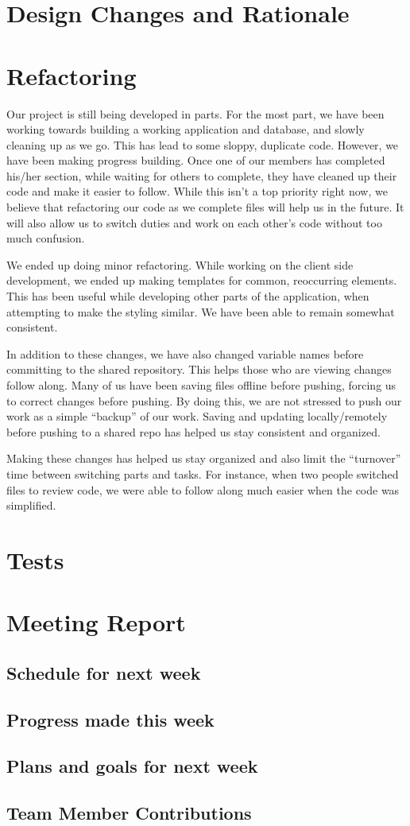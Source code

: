 \documentclass[12pt]{article}
\begin{document}
\section{Design Changes and Rationale}

\section{Refactoring}

    Our project is still being developed in parts. For the most part, we have been working towards building a working application and database, and slowly cleaning up as we go. This has lead to some sloppy, duplicate code. However, we have been making progress building. Once one of our members has completed his/her section, while waiting for others to complete, they have cleaned up their code and make it easier to follow. While this isn’t a top priority right now, we believe that refactoring our code as we complete files will help us in the future. It will also allow us to switch duties and work on each other's code without too much confusion.

    We ended up doing minor refactoring. While working on the client side development, we ended up making templates for common, reoccurring elements. This has been useful while developing other parts of the application, when attempting to make the styling similar. We have been able to remain somewhat consistent.

    In addition to these changes, we have also changed variable names before committing to the shared repository. This helps those who are viewing changes follow along. Many of us have been saving files offline before pushing, forcing us to correct changes before pushing. By doing this, we are not stressed to push our work as a simple “backup” of our work. Saving and updating locally/remotely before pushing to a shared repo has helped us stay consistent and organized.

    Making these changes has helped us stay organized and also limit the “turnover” time between switching parts and tasks. For instance, when two people switched files to review code, we were able to follow along much easier when the code was simplified.


\section{Tests}



\section{Meeting Report}
\subsection{Schedule for next week}

\subsection{Progress made this week}

\subsection{Plans and goals for next week}
\subsection{Team Member Contributions}
\end{document}
